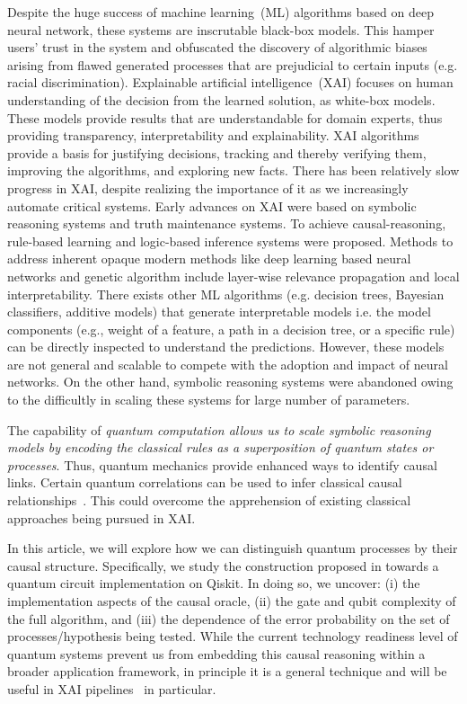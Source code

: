\documentclass[
 aps,
 jmp,
 amsmath,amssymb,
 reprint,
]{revtex4-2}
\begin{document}
Despite the huge success of machine learning~(ML) algorithms based on deep neural network, these systems are inscrutable black-box models.
This hamper users' trust in the system and obfuscated the discovery of algorithmic biases arising from flawed generated processes that are prejudicial to certain inputs (e.g. racial discrimination).
Explainable artificial intelligence~(XAI) focuses on human understanding of the decision from the learned solution, as white-box models.
These models provide results that are understandable for domain experts, thus providing transparency, interpretability and explainability.
XAI algorithms provide a basis for justifying decisions, tracking and thereby verifying them, improving the algorithms, and exploring new facts.
There has been relatively slow progress in XAI, despite realizing the importance of it as we increasingly automate critical systems.
Early advances on XAI were based on symbolic reasoning systems and truth maintenance systems.
To achieve causal-reasoning, rule-based learning and logic-based inference systems were proposed.
Methods to address inherent opaque modern methods like deep learning based neural networks and genetic algorithm include layer-wise relevance propagation and local interpretability.
There exists other ML algorithms (e.g. decision trees, Bayesian classifiers, additive models) that generate interpretable models i.e. the model components (e.g., weight of a feature, a path in a decision tree, or a specific rule) can be directly inspected to understand the predictions.
However, these models are not general and scalable to compete with the adoption and impact of neural networks.
On the other hand, symbolic reasoning systems were abandoned owing to the difficultly in scaling these systems for large number of parameters.

The capability of \textit{quantum computation allows us to scale symbolic reasoning models by encoding the classical rules as a superposition of quantum states or processes}.
Thus, quantum mechanics provide enhanced ways to identify causal links.
Certain quantum correlations can be used to infer classical causal relationships~\cite{ried2015quantum,fitzsimons2015quantum}.
This could overcome the apprehension of existing classical approaches being pursued in XAI.

In this article, we will explore how we can distinguish quantum processes by their causal structure.
Specifically, we study the construction proposed in \cite{chiribella2019quantum} towards a quantum circuit implementation on Qiskit.
In doing so, we uncover: (i) the implementation aspects of the causal oracle, (ii) the gate and qubit complexity of the full algorithm, and (iii) the dependence of the error probability on the set of processes/hypothesis being tested.
While the current technology readiness level of quantum systems prevent us from embedding this causal reasoning within a broader application framework, in principle it is a general technique and will be useful in XAI pipelines~\cite{lavin2021simulation,maruyama2021categorical} in particular.
\end{document}
